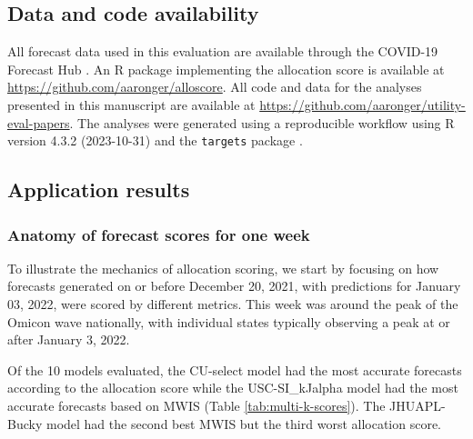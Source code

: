 \documentclass{article}\usepackage[]{graphicx}\usepackage[]{xcolor}
\begin{document}
\subsection{Data and code availability}

All forecast data used in this evaluation are available through the COVID-19 Forecast Hub \citep{cramer_reichlabcovid19-forecast-hub_2021}. An R package implementing the allocation score is available at \url{https://github.com/aaronger/alloscore}. All code and data for the analyses presented in this manuscript are available at \url{https://github.com/aaronger/utility-eval-papers}. The analyses were generated using a reproducible workflow using R version 4.3.2 (2023-10-31) and the {\tt targets} package \citep{Rcore-2023, landau_2021_targets}.

\subsection{Application results}




\subsubsection{Anatomy of forecast scores for one week}

To illustrate the mechanics of allocation scoring, we start by focusing on how forecasts generated on or before December 20, 2021, with predictions for January 03, 2022, were scored by different metrics.
This week was around the peak of the Omicon wave nationally, with individual states typically observing a peak at or after January 3, 2022.

Of the 10 models evaluated, the CU-select model had the most accurate forecasts according to the allocation score while the USC-SI\_kJalpha model had the most accurate forecasts based on MWIS (Table \ref{tab:multi-k-scores}).
The JHUAPL-Bucky model had the second best MWIS but the third worst allocation score.
\end{document}
